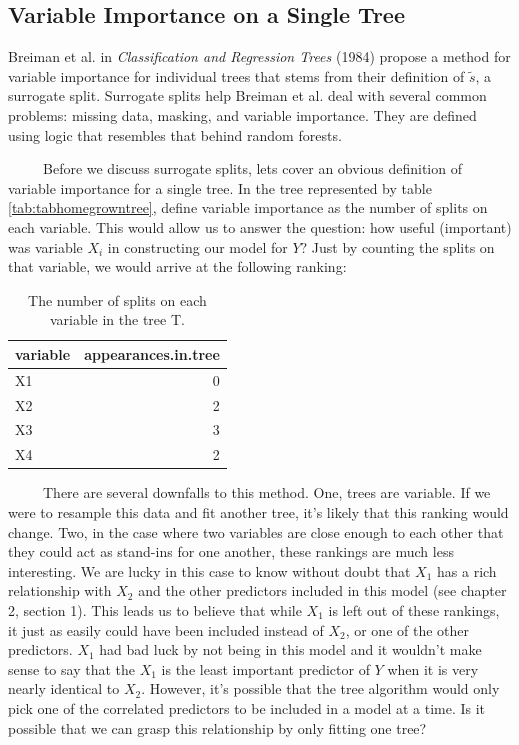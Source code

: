 \documentclass[12pt,twoside]{reedthesis}
\begin{document}
  \subsection{Variable Importance on a Single
  Tree}\label{variable-importance-on-a-single-tree}
  
  Breiman et al. in \emph{Classification and Regression Trees} (1984)
  propose a method for variable importance for individual trees that stems
  from their definition of \(\tilde{s}\), a surrogate split. Surrogate
  splits help Breiman et al. deal with several common problems: missing
  data, masking, and variable importance. They are defined using logic
  that resembles that behind random forests.
  
  ~~~~~Before we discuss surrogate splits, lets cover an obvious
  definition of variable importance for a single tree. In the tree
  represented by table \ref{tab:tabhomegrowntree}, define variable
  importance as the number of splits on each variable. This would allow us
  to answer the question: how useful (important) was variable \(X_i\) in
  constructing our model for \(Y\)? Just by counting the splits on that
  variable, we would arrive at the following ranking:
  
  \begin{table}
  
  \caption{\label{tab:unnamed-chunk-23}\label{tab:tabbvi}The number of splits on each variable in the tree T.}
  \centering
  \begin{tabular}[t]{l|r}
  \hline
  variable & appearances.in.tree\\
  \hline
  X1 & 0\\
  \hline
  X2 & 2\\
  \hline
  X3 & 3\\
  \hline
  X4 & 2\\
  \hline
  \end{tabular}
  \end{table}
  
  ~~~~~There are several downfalls to this method. One, trees are
  variable. If we were to resample this data and fit another tree, it's
  likely that this ranking would change. Two, in the case where two
  variables are close enough to each other that they could act as
  stand-ins for one another, these rankings are much less interesting. We
  are lucky in this case to know without doubt that \(X_1\) has a rich
  relationship with \(X_2\) and the other predictors included in this
  model (see chapter 2, section 1). This leads us to believe that while
  \(X_1\) is left out of these rankings, it just as easily could have been
  included instead of \(X_2\), or one of the other predictors. \(X_1\) had
  bad luck by not being in this model and it wouldn't make sense to say
  that the \(X_1\) is the least important predictor of \(Y\) when it is
  very nearly identical to \(X_2\). However, it's possible that the tree
  algorithm would only pick one of the correlated predictors to be
  included in a model at a time. Is it possible that we can grasp this
  relationship by only fitting one tree?
  
\end{document}
